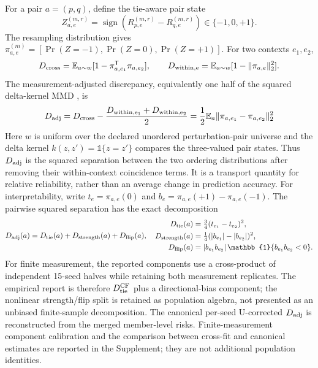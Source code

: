 \documentclass{article}
\begin{document}
For a pair $a=(p,q)$, define the tie-aware pair state
\begin{equation}
 Z_{a,e}^{(m,r)}=\operatorname{sign}\!\left(R_{p,e}^{(m,r)}-R_{q,e}^{(m,r)}\right)
 \in\{-1,0,+1\}.
\end{equation}
The resampling distribution gives $\pi_{a,e}^{(m)}=[\Pr(Z=-1),\Pr(Z=0),
\Pr(Z=+1)]$. For two contexts $e_1,e_2$,
\begin{equation}
  D_{\rm cross}=\mathbb E_{a\sim w}[1-\pi_{a,e_1}^{\mathsf T}\pi_{a,e_2}],\qquad
  D_{\rm within,e}=\mathbb E_{a\sim w}[1-\|\pi_{a,e}\|_2^2].
\end{equation}
The measurement-adjusted discrepancy, equivalently one half of the squared
delta-kernel MMD
\citep{gretton2012kernel}, is
\begin{equation}
 D_{\rm adj}=D_{\rm cross}-
 \frac{D_{\rm within,e_1}+D_{\rm within,e_2}}{2}
 =\frac12\mathbb E_a\|\pi_{a,e_1}-\pi_{a,e_2}\|_2^2
 \label{eq:ordering_identity}
\end{equation}
Here $w$ is uniform over the declared unordered perturbation-pair universe and
the delta kernel $k(z,z')=\mathbb 1\{z=z'\}$ compares the three-valued pair
states. Thus $D_{\rm adj}$ is the squared separation between the two ordering
distributions after removing their within-context coincidence terms. It is a
transport quantity for relative reliability, rather than an average change in
prediction accuracy.
For interpretability, write $t_e=\pi_{a,e}(0)$ and
$b_e=\pi_{a,e}(+1)-\pi_{a,e}(-1)$. The pairwise squared separation has the
exact decomposition
\begin{equation}
 D_{\rm adj}(a)=D_{\rm tie}(a)+D_{\rm strength}(a)+D_{\rm flip}(a),\quad
 \begin{aligned}
 D_{\rm tie}(a)&=\tfrac34(t_{e_1}-t_{e_2})^2,\\
 D_{\rm strength}(a)&=\tfrac14(|b_{e_1}|-|b_{e_2}|)^2,\\
 D_{\rm flip}(a)&=|b_{e_1}b_{e_2}|\,\mathbb{1}\{b_{e_1}b_{e_2}<0\}.
 \end{aligned}
 \label{eq:ordering_decomposition}
\end{equation}
For finite measurement, the reported components use a cross-product of
independent 15-seed halves while retaining both measurement replicates.
The empirical report is therefore $D_{\rm tie}^{\rm CF}$ plus a
directional-bias component; the nonlinear strength/flip split is retained as
population algebra, not presented as an unbiased finite-sample decomposition.
The canonical per-seed U-corrected $D_{\rm adj}$ is reconstructed from the
merged member-level risks. Finite-measurement component calibration and the
comparison between cross-fit and canonical estimates are reported in the
Supplement; they are not additional population identities.
\end{document}
